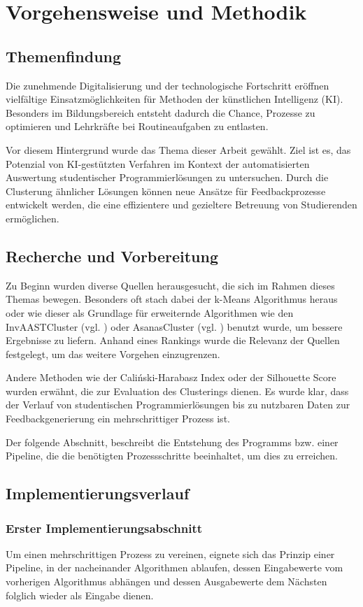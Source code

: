 \chapter{Vorgehensweise und Methodik}

\section{Themenfindung}
Die zunehmende Digitalisierung und der technologische Fortschritt eröffnen vielfältige Einsatzmöglichkeiten für Methoden der künstlichen Intelligenz (KI). Besonders im Bildungsbereich entsteht dadurch die Chance, Prozesse zu optimieren und Lehrkräfte bei Routineaufgaben zu entlasten.

Vor diesem Hintergrund wurde das Thema dieser Arbeit gewählt. Ziel ist es, das Potenzial von KI-gestützten Verfahren im Kontext der automatisierten Auswertung studentischer Programmierlösungen zu untersuchen. Durch die Clusterung ähnlicher Lösungen können neue Ansätze für Feedbackprozesse entwickelt werden, die eine effizientere und gezieltere Betreuung von Studierenden ermöglichen.


\section{Recherche und Vorbereitung}
Zu Beginn wurden diverse Quellen herausgesucht, die sich im Rahmen dieses Themas bewegen. Besonders oft stach dabei der k-Means Algorithmus heraus oder wie dieser als Grundlage für erweiternde Algorithmen wie den InvAASTCluster (vgl. \cite{Orvalho.28.06.2022}) oder AsanasCluster (vgl. \cite{Paiva.2024}) benutzt wurde, um bessere Ergebnisse zu liefern. Anhand eines Rankings wurde die Relevanz der Quellen festgelegt, um das weitere Vorgehen einzugrenzen.

Andere Methoden wie der Caliński-Harabasz Index oder der Silhouette Score wurden erwähnt, die zur Evaluation des Clusterings dienen. Es wurde klar, dass der Verlauf von studentischen Programmierlösungen bis zu nutzbaren Daten zur Feedbackgenerierung ein mehrschrittiger Prozess ist.

Der folgende Abschnitt, beschreibt die Entstehung des Programms bzw. einer Pipeline, die die benötigten Prozessschritte beeinhaltet, um dies zu erreichen.


\section{Implementierungsverlauf}
\subsection{Erster Implementierungsabschnitt}
Um einen mehrschrittigen Prozess zu vereinen, eignete sich das Prinzip einer Pipeline, in der nacheinander Algorithmen ablaufen, dessen Eingabewerte vom vorherigen Algorithmus abhängen und dessen Ausgabewerte dem Nächsten folglich wieder als Eingabe dienen.


